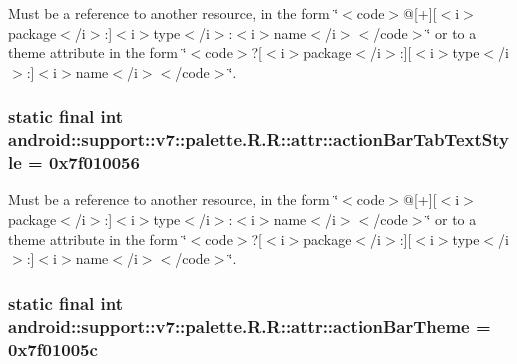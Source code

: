 Must be a reference to another resource, in the form \char`\"{}$<$code$>$@\mbox{[}+\mbox{]}\mbox{[}$<$i$>$package$<$/i$>$:\mbox{]}$<$i$>$type$<$/i$>$:$<$i$>$name$<$/i$>$$<$/code$>$\char`\"{} or to a theme attribute in the form \char`\"{}$<$code$>$?\mbox{[}$<$i$>$package$<$/i$>$:\mbox{]}\mbox{[}$<$i$>$type$<$/i$>$:\mbox{]}$<$i$>$name$<$/i$>$$<$/code$>$\char`\"{}. \hypertarget{classandroid_1_1support_1_1v7_1_1palette_1_1_r_1_1attr_a8965c149bae6aa6029e188ce604c703}{
\subsubsection[{actionBarTabTextStyle}]{\setlength{\rightskip}{0pt plus 5cm}static final int android::support::v7::palette.R.R::attr::actionBarTabTextStyle = 0x7f010056}}
\label{classandroid_1_1support_1_1v7_1_1palette_1_1_r_1_1attr_a8965c149bae6aa6029e188ce604c703}


Must be a reference to another resource, in the form \char`\"{}$<$code$>$@\mbox{[}+\mbox{]}\mbox{[}$<$i$>$package$<$/i$>$:\mbox{]}$<$i$>$type$<$/i$>$:$<$i$>$name$<$/i$>$$<$/code$>$\char`\"{} or to a theme attribute in the form \char`\"{}$<$code$>$?\mbox{[}$<$i$>$package$<$/i$>$:\mbox{]}\mbox{[}$<$i$>$type$<$/i$>$:\mbox{]}$<$i$>$name$<$/i$>$$<$/code$>$\char`\"{}. \hypertarget{classandroid_1_1support_1_1v7_1_1palette_1_1_r_1_1attr_094d506c8e773d089e73dda25166eb87}{
\subsubsection[{actionBarTheme}]{\setlength{\rightskip}{0pt plus 5cm}static final int android::support::v7::palette.R.R::attr::actionBarTheme = 0x7f01005c}}
\label{classandroid_1_1support_1_1v7_1_1palette_1_1_r_1_1attr_094d506c8e773d089e73dda25166eb87}


